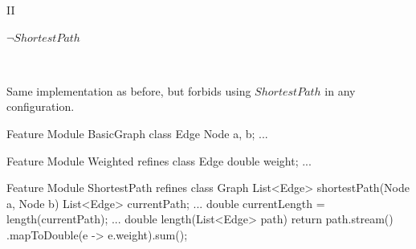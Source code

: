 \begin{frame}[fragile]{\myframetitle{} II}
	\begin{fancycolumns}[animation=none]
		\centering
		
		\textcolor{lecturegreen}{$\neg ShortestPath$}
		
		~
		\begin{note}{}
			Same implementation as before, but forbids using $ShortestPath$ in any configuration.
		\end{note}
		\nextcolumn
\begin{codetight}{Feature Module BasicGraph}
	class Edge { Node a, b; ... }
\end{codetight}	
\begin{codetight}{Feature Module Weighted}
	refines class Edge { double weight; ... }
\end{codetight}	
\begin{codetight}{Feature Module ShortestPath}
	refines class Graph {
		List<Edge> shortestPath(Node a, Node b){
			List<Edge> currentPath;
			... 
			double currentLength = length(currentPath);
			... 
		}
		double length(List<Edge> path) {
			return path.stream()
			.mapToDouble(e -> e.weight).sum();
		}
	}
\end{codetight}	
	\end{fancycolumns}
\end{frame}

